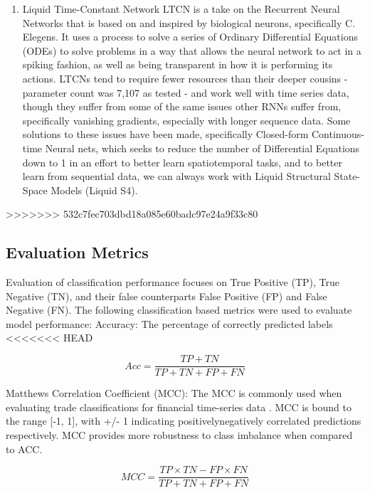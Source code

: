 \documentclass[10pt,twocolumn,letterpaper]{article}
\begin{document}
\begin{enumerate}
        \item{Liquid Time-Constant Network LTCN is a take on the Recurrent Neural Networks that is based on and inspired by biological neurons, specifically C. Elegens. It uses a process to solve a series of Ordinary Differential Equations (ODEs) to solve problems in a way that allows the neural network to act in a spiking fashion, as well as being transparent in how it is performing its actions. LTCNs tend to require fewer resources than their deeper cousins - parameter count was 7,107 as tested - and work well with time series data, though they suffer from some of the same issues other RNNs suffer from, specifically vanishing gradients, especially with longer sequence data. Some solutions to these issues have been made, specifically Closed-form Continuous-time Neural nets, which seeks to reduce the number of Differential Equations down to 1 in an effort to better learn spatiotemporal tasks, and to better learn from sequential data, we can always work with Liquid Structural State-Space Models (Liquid S4).  }
    \end{enumerate}
>>>>>>> 532c7fec703dbd18a085e60badc97e24a9f33c80

\subsection{Evaluation Metrics}
Evaluation of classification performance focuses on True Positive (TP), True Negative (TN), and their false counterparts False Positive (FP) and False Negative (FN). The following classification based metrics were used to evaluate model performance:
Accuracy: The percentage of correctly predicted labels
<<<<<<< HEAD
 
\begin{equation} \label{eq:accuracy}
    Acc = \frac{TP + TN}{TP + TN + FP + FN}
\end{equation}

Matthews Correlation Coefficient (MCC): The MCC is commonly used when evaluating trade classifications for financial time-series data \cite{STT_Paper,STLAT_sota,zou_survey}. MCC is bound to the range [-1, 1], with +/- 1 indicating positively\/negatively correlated predictions respectively. MCC provides more robustness to class imbalance when compared to ACC.

\begin{equation} \label{eq:mcc}
    MCC = \frac{TP \times TN - FP \times FN}{TP + TN + FP + FN}
\end{equation}
\end{document}
